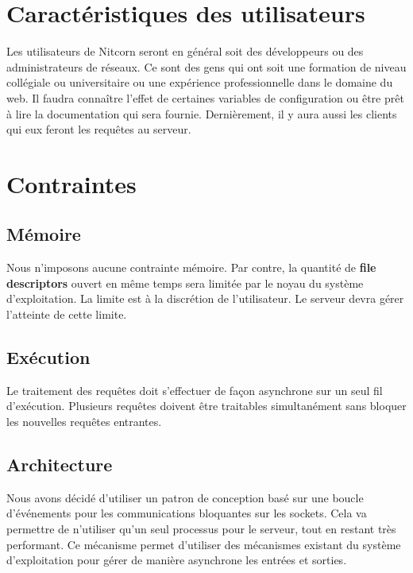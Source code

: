 \documentclass{scrreprt}
\begin{document}
\section{Caractéristiques des utilisateurs}
Les utilisateurs de Nitcorn seront en général soit des développeurs ou des
administrateurs de réseaux. Ce sont des gens qui ont soit une formation de
niveau collégiale ou universitaire ou une expérience professionnelle dans
le domaine du web. Il faudra connaître l'effet de certaines variables de
configuration ou être prêt à lire la documentation qui sera fournie.
Dernièrement, il y aura aussi les clients qui eux feront les requêtes
au serveur.
\section{Contraintes}

\subsection{Mémoire}
Nous n'imposons aucune contrainte mémoire. Par contre, la quantité de
\textbf{file descriptors} ouvert en même temps sera limitée par le noyau du
système d'exploitation. La limite est à la discrétion de l'utilisateur. Le
serveur devra gérer l'atteinte de cette limite.
\subsection{Exécution}
Le traitement des requêtes doit s'effectuer de façon asynchrone sur un seul fil
d'exécution. Plusieurs requêtes doivent être traitables simultanément sans bloquer
les nouvelles requêtes entrantes.
\subsection{Architecture}
Nous avons décidé d'utiliser un patron de conception basé sur
une boucle d’événements pour les communications bloquantes sur les sockets. Cela va 
permettre de n'utiliser qu'un seul processus pour le serveur, tout en restant très performant.
Ce mécanisme permet d'utiliser des mécanismes existant du système d'exploitation
pour gérer de manière asynchrone les entrées et sorties\cite{c10k}.
\end{document}
